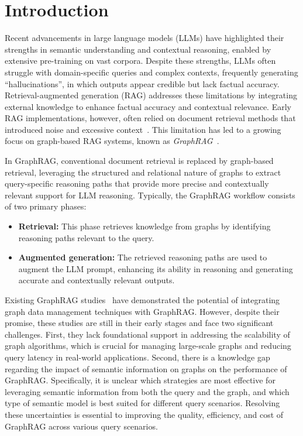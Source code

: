 \section{Introduction}
\label{section: introduction}

Recent advancements in large language models (LLMs) have highlighted their strengths in semantic understanding and contextual reasoning, enabled by extensive pre-training on vast corpora. Despite these strengths, LLMs often struggle with domain-specific queries and complex contexts, frequently generating ``hallucinations'', in which outputs appear credible but lack factual accuracy. 
Retrieval-augmented generation (RAG) addresses these limitations by integrating external knowledge to enhance factual accuracy and contextual relevance.
Early RAG implementations, however, often relied on document retrieval methods that introduced noise and excessive context~\cite{lewis2021retrieval,ColBERT,yu2023generate, HyDE}. 
This limitation has led to a growing focus on graph-based RAG systems, known as {\it GraphRAG}~\cite{GraphRAG,surveyTJFD,GRAG,SubgraphRAG}. 

In GraphRAG, conventional document retrieval is replaced by graph-based retrieval, leveraging the structured and relational nature of graphs to extract query-specific reasoning paths that provide more precise and contextually relevant support for LLM reasoning.
Typically, the GraphRAG workflow consists of two primary phases:
\begin{itemize}[leftmargin=12pt]
\item {\bf Retrieval:} This phase retrieves knowledge from graphs by identifying reasoning paths relevant to the query. 
\item {\bf Augmented generation:} The retrieved reasoning paths are used to augment the LLM prompt, enhancing its ability in reasoning and generating accurate and contextually relevant outputs. 
\end{itemize}
Existing GraphRAG studies~\cite{GraphRAG,GCR, RoG,LessIsMore,StructGPT,ref:kelp,ToG,DoG}
have demonstrated the potential of integrating graph data management techniques with GraphRAG. However, despite their promise, these studies are still in their early stages and face two significant challenges. First, they lack foundational support in addressing the scalability of graph algorithms, which is crucial for managing large-scale graphs and reducing query latency in real-world applications. Second, there is a knowledge gap regarding the impact of semantic information on graphs on the performance of GraphRAG. Specifically, it is unclear which strategies are most effective for leveraging semantic information from both the query and the graph, and which type of semantic model is best suited for different query scenarios. Resolving these uncertainties is essential to improving the quality, efficiency, and cost of GraphRAG across various query scenarios.

